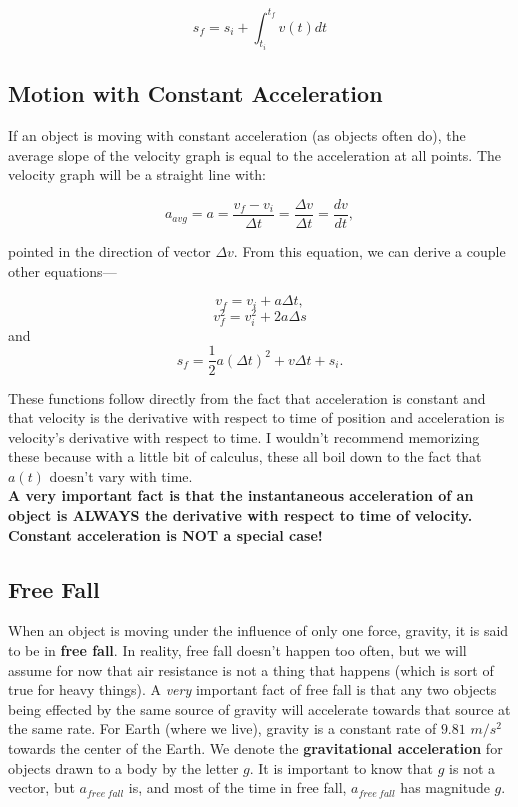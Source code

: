 \documentclass[12pt,letterpaper]{article}
\begin{document}
\begin{center}
$$s_{f} = s_{i} + \int_{t_{i}}^{t_{f}}v(t)dt$$\linebreak
\end{center}

\subsection[Motion with Constant Acceleration]{Motion with Constant Acceleration}

If an object is moving with constant acceleration (as objects often do), the average slope of the velocity graph is equal to the acceleration at all points. The velocity graph will be a straight line with:

\begin{center}
$$a_{avg} = a = \frac{v_{f}-v_{i}}{\Delta t} = \frac{\Delta v}{\Delta t} = \frac{dv}{dt},$$\linebreak
\end{center}

pointed in the direction of vector $\Delta v$. From this equation, we can derive a couple other equations---

\begin{center}
$$v_{f} = v_{i} + a\Delta t,$$ $$v_{f}^{2} = v_{i}^{2} + 2a\Delta s$$ and $$s_{f} = \frac{1}{2}a(\Delta t)^{2} + v\Delta t + s_{i}.$$\linebreak
\end{center}

These functions follow directly from the fact that acceleration is constant and that velocity is the derivative with respect to time of position and acceleration is velocity's derivative with respect to time. I wouldn't recommend memorizing these because with a little bit of calculus, these all boil down to the fact that $a(t)$ doesn't vary with time.\\

\textbf{A very important fact is that the instantaneous acceleration of an object is ALWAYS the derivative with respect to time of velocity. Constant acceleration is NOT a special case!}

\subsection[Free Fall]{Free Fall}

When an object is moving under the influence of only one force, gravity, it is said to be in \textbf{free fall}. In reality, free fall doesn't happen too often, but we will assume for now that air resistance is not a thing that happens (which is sort of true for heavy things). A \textit{very} important fact of free fall is that any two objects being effected by the same source of gravity will accelerate towards that source at the same rate. For Earth (where we live), gravity is a constant rate of $9.81$ $m/s^{2}$ towards the center of the Earth. We denote the \textbf{gravitational acceleration} for objects drawn to a body by the letter $g$. It is important to know that $g$ is not a vector, but $a_{free\ fall}$ is, and most of the time in free fall, $a_{free\ fall}$ has magnitude $g$.
\end{document}
